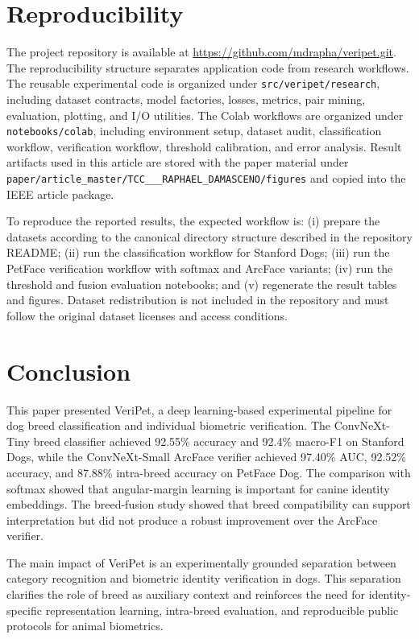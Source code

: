 \documentclass[conference]{IEEEtran}
\begin{document}
\section{Reproducibility}

The project repository is available at \url{https://github.com/mdrapha/veripet.git}. The reproducibility structure separates application code from research workflows. The reusable experimental code is organized under \texttt{src/veripet/research}, including dataset contracts, model factories, losses, metrics, pair mining, evaluation, plotting, and I/O utilities. The Colab workflows are organized under \texttt{notebooks/colab}, including environment setup, dataset audit, classification workflow, verification workflow, threshold calibration, and error analysis. Result artifacts used in this article are stored with the paper material under \texttt{paper/article\_master/TCC\_\_\_RAPHAEL\_DAMASCENO/figures} and copied into the IEEE article package.

To reproduce the reported results, the expected workflow is: (i) prepare the datasets according to the canonical directory structure described in the repository README; (ii) run the classification workflow for Stanford Dogs; (iii) run the PetFace verification workflow with softmax and ArcFace variants; (iv) run the threshold and fusion evaluation notebooks; and (v) regenerate the result tables and figures. Dataset redistribution is not included in the repository and must follow the original dataset licenses and access conditions.

\section{Conclusion}

This paper presented VeriPet, a deep learning-based experimental pipeline for dog breed classification and individual biometric verification. The ConvNeXt-Tiny breed classifier achieved 92.55\% accuracy and 92.4\% macro-F1 on Stanford Dogs, while the ConvNeXt-Small ArcFace verifier achieved 97.40\% AUC, 92.52\% accuracy, and 87.88\% intra-breed accuracy on PetFace Dog. The comparison with softmax showed that angular-margin learning is important for canine identity embeddings. The breed-fusion study showed that breed compatibility can support interpretation but did not produce a robust improvement over the ArcFace verifier.

The main impact of VeriPet is an experimentally grounded separation between category recognition and biometric identity verification in dogs. This separation clarifies the role of breed as auxiliary context and reinforces the need for identity-specific representation learning, intra-breed evaluation, and reproducible public protocols for animal biometrics.

\balance


\end{document}
